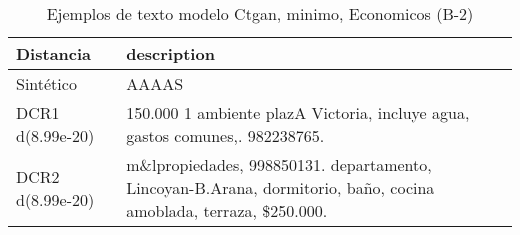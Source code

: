 \begin{table}[H]
\centering
\fontsize{10}{14}\selectfont
\caption{Ejemplos de texto modelo Ctgan, minimo, Economicos (B-2)}
\label{table-example-economicos-b-2-ctgan-min-text}
\begin{tabular}{|l|m{35em}|}
\hline
\rowcolor[gray]{0.8}
Distancia & description \\
\hline Sintético & AAAAS \\
\hline DCR1 d(8.99e-20) & 150.000 1 ambiente plazA Victoria, incluye agua, gastos comunes,. 982238765. \\
\hline DCR2 d(8.99e-20) & m\&lpropiedades, 998850131. departamento, Lincoyan-B.Arana, dormitorio, ba\~no, cocina amoblada, terraza, \$250.000. \\
\hline
\end{tabular}
\end{table}
